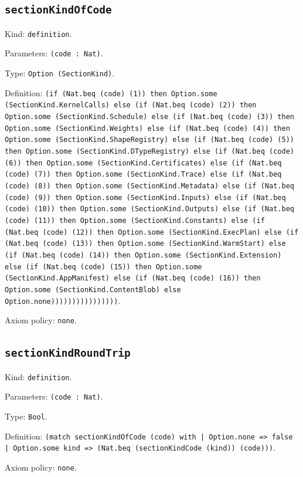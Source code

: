 \documentclass[11pt]{article}
\begin{document}
\subsection*{\texttt{sectionKindOfCode}}
\noindent Kind: \texttt{definition}.\par
\noindent Parameters: \texttt{(code : Nat)}.\par
\noindent Type: \texttt{Option (SectionKind)}.\par
\noindent Definition: \texttt{(if (Nat.beq (code) (1)) then Option.some (SectionKind.KernelCalls) else (if (Nat.beq (code) (2)) then Option.some (SectionKind.Schedule) else (if (Nat.beq (code) (3)) then Option.some (SectionKind.Weights) else (if (Nat.beq (code) (4)) then Option.some (SectionKind.ShapeRegistry) else (if (Nat.beq (code) (5)) then Option.some (SectionKind.DTypeRegistry) else (if (Nat.beq (code) (6)) then Option.some (SectionKind.Certificates) else (if (Nat.beq (code) (7)) then Option.some (SectionKind.Trace) else (if (Nat.beq (code) (8)) then Option.some (SectionKind.Metadata) else (if (Nat.beq (code) (9)) then Option.some (SectionKind.Inputs) else (if (Nat.beq (code) (10)) then Option.some (SectionKind.Outputs) else (if (Nat.beq (code) (11)) then Option.some (SectionKind.Constants) else (if (Nat.beq (code) (12)) then Option.some (SectionKind.ExecPlan) else (if (Nat.beq (code) (13)) then Option.some (SectionKind.WarmStart) else (if (Nat.beq (code) (14)) then Option.some (SectionKind.Extension) else (if (Nat.beq (code) (15)) then Option.some (SectionKind.AppManifest) else (if (Nat.beq (code) (16)) then Option.some (SectionKind.ContentBlob) else Option.none))))))))))))))))}.\par
\noindent Axiom policy: \texttt{none}.\par
\subsection*{\texttt{sectionKindRoundTrip}}
\noindent Kind: \texttt{definition}.\par
\noindent Parameters: \texttt{(code : Nat)}.\par
\noindent Type: \texttt{Bool}.\par
\noindent Definition: \texttt{(match sectionKindOfCode (code) with | Option.none => false | Option.some kind => (Nat.beq (sectionKindCode (kind)) (code)))}.\par
\noindent Axiom policy: \texttt{none}.\par
\end{document}

